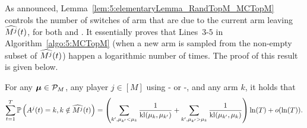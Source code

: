 

As announced, Lemma~\ref{lem:5:elementaryLemma_RandTopM_MCTopM} controls
the number of switches of arm that are due to the current arm leaving $\widehat{M^j}(t)$,
for both \RandTopM{} and \MCTopM{}. It essentially proves that Lines~$3$-$5$ in Algorithm~\ref{algo:5:MCTopM} (when a new arm is sampled from the non-empty subset of $\widehat{M^j}(t)$)
happen a logarithmic number of times. The proof of this result is given below.

\begin{lemma}\label{lem:5:elementaryLemma_RandTopM_MCTopM}
\begin{leftbar}[lemmabar]  %
  For any $\boldsymbol{\mu}\in\mathcal{P}_M$,
  any player $j \in [M]$ using
  \RandTopM- or \MCTopM-\klUCB,
  and any arm $k$,
  it holds that
  \begin{equation*}
    \sum_{t=1}^T
    \mathbb{P}\left(A^j(t)=k, k\notin \widehat{M^j}(t)\right)
    = \left(\sum_{k', \mu_{k'} < \mu_k}\frac{1}{\mathrm{kl}(\mu_k,\mu_{k'})} + \sum_{k', \mu_{k'} > \mu_k}\frac{1}{\mathrm{kl}(\mu_{k'},\mu_{k})}\right) \ln(T) + o(\ln(T)).
  \end{equation*}
\end{leftbar}  %
\end{lemma}


